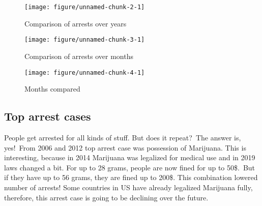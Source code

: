 \documentclass{article}\usepackage[]{graphicx}\usepackage[]{color}
\makeatletter
\def\maxwidth{ %
  \ifdim\Gin@nat@width>\linewidth
    \linewidth
  \else
    \Gin@nat@width
  \fi
}
\newenvironment{knitrout}{}{} %
\makeatother
\begin{document}
        \begin{figure}[hbtp]
          \caption{Comparison of arrests over years}
\begin{knitrout}
\color{fgcolor}
\texttt{[image: figure/unnamed-chunk-2-1]} 

\end{knitrout}
        \end{figure}
          
        \begin{figure}[hbtp]
          \caption{Comparison of arrests over months}
\begin{knitrout}
\color{fgcolor}
\texttt{[image: figure/unnamed-chunk-3-1]} 

\end{knitrout}
        \end{figure}
          
        \begin{figure}[hbtp]
          \caption{Months compared}
\begin{knitrout}
\color{fgcolor}
\texttt{[image: figure/unnamed-chunk-4-1]} 

\end{knitrout}
        \end{figure}

  \maketitle
    \newpage
      \subsection{Top arrest cases}
      People get arrested for all kinds of stuff. But does it repeat?\
      The answer is, yes!\
      From 2006 and 2012 top arrest case was possession of Marijuana. This is interesting, because in 2014       Marijuana was legalized for medical use and in 2019 laws changed a bit. For up to 28 grams, people        are now fined for up to 50\$.\
      But if they have up to 56 grams, they are fined up to 200\$. This combination lowered number of           arrests! Some countries in US have already legalized Marijuana fully, therefore, this arrest case is       going to be declining over the future.
      
\end{document}
